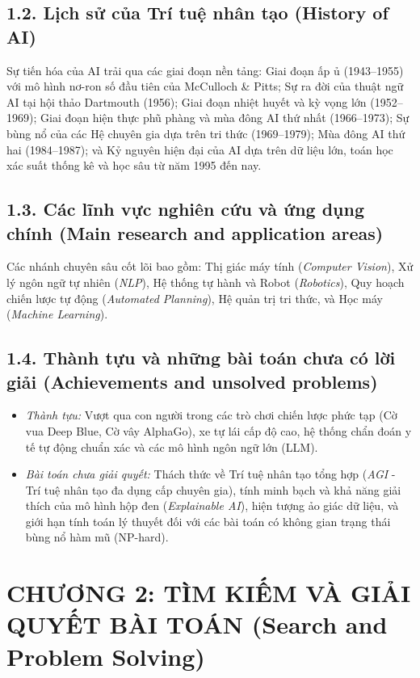 \documentclass[11pt,a4paper]{article}
\begin{document}
\subsection{1.2. Lịch sử của Trí tuệ nhân tạo (History of AI)}
Sự tiến hóa của AI trải qua các giai đoạn nền tảng: Giai đoạn ấp ủ (1943--1955) với mô hình nơ-ron số đầu tiên của McCulloch \& Pitts; Sự ra đời của thuật ngữ AI tại hội thảo Dartmouth (1956); Giai đoạn nhiệt huyết và kỳ vọng lớn (1952--1969); Giai đoạn hiện thực phũ phàng và mùa đông AI thứ nhất (1966--1973); Sự bùng nổ của các Hệ chuyên gia dựa trên tri thức (1969--1979); Mùa đông AI thứ hai (1984--1987); và Kỷ nguyên hiện đại của AI dựa trên dữ liệu lớn, toán học xác suất thống kê và học sâu từ năm 1995 đến nay.

\subsection{1.3. Các lĩnh vực nghiên cứu và ứng dụng chính (Main research and application areas)}
Các nhánh chuyên sâu cốt lõi bao gồm: Thị giác máy tính (\textit{Computer Vision}), Xử lý ngôn ngữ tự nhiên (\textit{NLP}), Hệ thống tự hành và Robot (\textit{Robotics}), Quy hoạch chiến lược tự động (\textit{Automated Planning}), Hệ quản trị tri thức, và Học máy (\textit{Machine Learning}).

\subsection{1.4. Thành tựu và những bài toán chưa có lời giải (Achievements and unsolved problems)}
\begin{itemize}
    \item \textit{Thành tựu:} Vượt qua con người trong các trò chơi chiến lược phức tạp (Cờ vua Deep Blue, Cờ vây AlphaGo), xe tự lái cấp độ cao, hệ thống chẩn đoán y tế tự động chuẩn xác và các mô hình ngôn ngữ lớn (LLM).
    \item \textit{Bài toán chưa giải quyết:} Thách thức về Trí tuệ nhân tạo tổng hợp (\textit{AGI} - Trí tuệ nhân tạo đa dụng cấp chuyên gia), tính minh bạch và khả năng giải thích của mô hình hộp đen (\textit{Explainable AI}), hiện tượng ảo giác dữ liệu, và giới hạn tính toán lý thuyết đối với các bài toán có không gian trạng thái bùng nổ hàm mũ (NP-hard).
\end{itemize}

\section{CHƯƠNG 2: TÌM KIẾM VÀ GIẢI QUYẾT BÀI TOÁN (Search and Problem Solving)}
\end{document}
